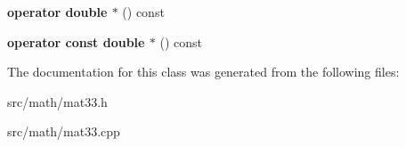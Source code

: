 \begin{DoxyCompactItemize}
\item 
\hypertarget{classmath_1_1mat33_a24c9ed632b73464a6e17cdad4eeef613}{
{\bfseries operator double $\ast$} () const }
\label{classmath_1_1mat33_a24c9ed632b73464a6e17cdad4eeef613}

\item 
\hypertarget{classmath_1_1mat33_a97e2d6b636e4ba085f10d73a6d2af786}{
{\bfseries operator const double $\ast$} () const }
\label{classmath_1_1mat33_a97e2d6b636e4ba085f10d73a6d2af786}

\end{DoxyCompactItemize}


The documentation for this class was generated from the following files:\begin{DoxyCompactItemize}
\item 
src/math/mat33.h\item 
src/math/mat33.cpp\end{DoxyCompactItemize}
